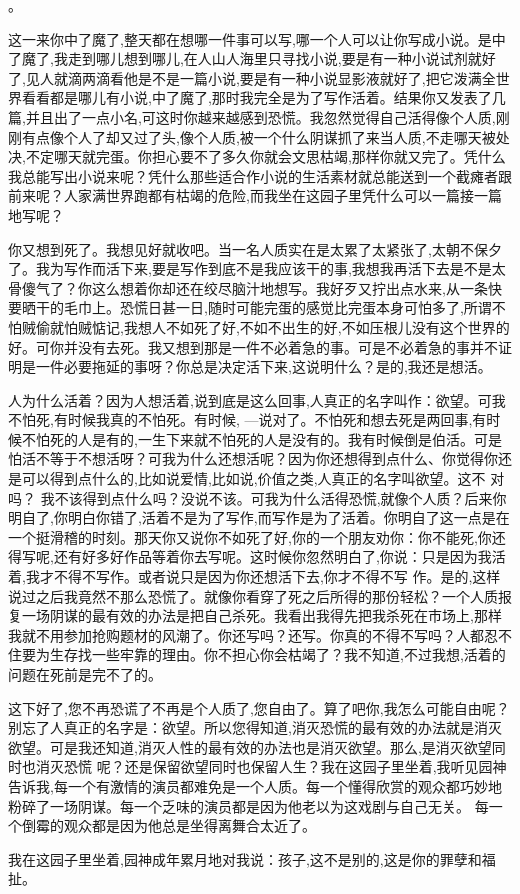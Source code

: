 \documentclass{ctexart}
\renewcommand{\\}{\par}
\begin{document}
。\\这一来你中了魔了,整天都在想哪一件事可以写,哪一个人可以让你写成小说。是中了魔了,我走到哪儿想到哪儿,在人山人海里只寻找小说,要是有一种小说试剂就好了,见人就滴两滴看他是不是一篇小说,要是有一种小说显影液就好了,把它泼满全世界看看都是哪儿有小说,中了魔了,那时我完全是为了写作活着。结果你又发表了几篇,并且出了一点小名,可这时你越来越感到恐慌。我忽然觉得自己活得像个人质,刚刚有点像个人了却又过了头,像个人质,被一个什么阴谋抓了来当人质,不走哪天被处决,不定哪天就完蛋。你担心要不了多久你就会文思枯竭,那样你就又完了。凭什么我总能写出小说来呢？凭什么那些适合作小说的生活素材就总能送到一个截瘫者跟前来呢？人家满世界跑都有枯竭的危险,而我坐在这园子里凭什么可以一篇接一篇地写呢？\\你又想到死了。我想见好就收吧。当一名人质实在是太累了太紧张了,太朝不保夕了。我为写作而活下来,要是写作到底不是我应该干的事,我想我再活下去是不是太骨傻气了？你这么想着你却还在绞尽脑汁地想写。我好歹又拧出点水来,从一条快要晒干的毛巾上。恐慌日甚一日,随时可能完蛋的感觉比完蛋本身可怕多了,所谓不怕贼偷就怕贼惦记,我想人不如死了好,不如不出生的好,不如压根儿没有这个世界的好。可你并没有去死。我又想到那是一件不必着急的事。可是不必着急的事并不证明是一件必要拖延的事呀？你总是决定活下来,这说明什么？是的,我还是想活。\\人为什么活着？因为人想活着,说到底是这么回事,人真正的名字叫作：欲望。可我不怕死,有时候我真的不怕死。有时候, ---说对了。不怕死和想去死是两回事,有时候不怕死的人是有的,一生下来就不怕死的人是没有的。我有时候倒是伯活。可是怕活不等于不想活呀？可我为什么还想活呢？因为你还想得到点什么、你觉得你还是可以得到点什么的,比如说爱情,比如说,价值之类,人真正的名字叫欲望。这不 对吗？ 我不该得到点什么吗？没说不该。可我为什么活得恐慌,就像个人质？后来你明自了,你明白你错了,活着不是为了写作,而写作是为了活着。你明自了这一点是在一个挺滑稽的时刻。那天你又说你不如死了好,你的一个朋友劝你：你不能死,你还得写呢,还有好多好作品等着你去写呢。这时候你忽然明白了,你说：只是因为我活着,我才不得不写作。或者说只是因为你还想活下去,你才不得不写 作。是的,这样说过之后我竟然不那么恐慌了。就像你看穿了死之后所得的那份轻松？一个人质报复一场阴谋的最有效的办法是把自己杀死。我看出我得先把我杀死在市场上,那样我就不用参加抢购题材的风潮了。你还写吗？还写。你真的不得不写吗？人都忍不住要为生存找一些牢靠的理由。你不担心你会枯竭了？我不知道,不过我想,活着的问题在死前是完不了的。\\这下好了,您不再恐谎了不再是个人质了,您自由了。算了吧你,我怎么可能自由呢？别忘了人真正的名字是：欲望。所以您得知道,消灭恐慌的最有效的办法就是消灭欲望。可是我还知道,消灭人性的最有效的办法也是消灭欲望。那么,是消灭欲望同时也消灭恐慌 呢？还是保留欲望同时也保留人生？我在这园子里坐着,我听见园神告诉我,每一个有激情的演员都难免是一个人质。每一个懂得欣赏的观众都巧妙地粉碎了一场阴谋。每一个乏味的演员都是因为他老以为这戏剧与自己无关。 每一个倒霉的观众都是因为他总是坐得离舞合太近了。\\我在这园子里坐着,园神成年累月地对我说：孩子,这不是别的,这是你的罪孽和福扯。
\end{document}
